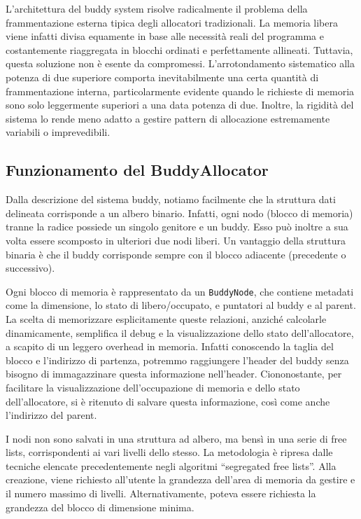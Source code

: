 L’architettura del buddy system risolve radicalmente il problema della frammentazione esterna tipica degli allocatori tradizionali. La memoria libera viene infatti divisa equamente in base alle necessità reali del programma e costantemente riaggregata in blocchi ordinati e perfettamente allineati. Tuttavia, questa soluzione non è esente da compromessi. L'arrotondamento sistematico alla potenza di due superiore comporta inevitabilmente una certa quantità di frammentazione interna, particolarmente evidente quando le richieste di memoria sono solo leggermente superiori a una data potenza di due. Inoltre, la rigidità del sistema lo rende meno adatto a gestire pattern di allocazione estremamente variabili o imprevedibili.

\subsection{Funzionamento del BuddyAllocator}

Dalla descrizione del sistema buddy, notiamo facilmente che la struttura dati delineata corrisponde a un albero binario. Infatti, ogni nodo (blocco di memoria) tranne la radice possiede un singolo genitore e un buddy. Esso può inoltre a sua volta essere scomposto in ulteriori due nodi liberi. Un vantaggio della struttura binaria è che il buddy corrisponde sempre con il blocco adiacente (precedente o successivo).

Ogni blocco di memoria è rappresentato da un \texttt{BuddyNode}, che contiene metadati come la dimensione, lo stato di libero/occupato, e puntatori al buddy e al parent. La scelta di memorizzare esplicitamente queste relazioni, anziché calcolarle dinamicamente, semplifica il debug e la visualizzazione dello stato dell'allocatore, a scapito di un leggero overhead in memoria. Infatti conoscendo la taglia del blocco e l’indirizzo di partenza, potremmo raggiungere l’header del buddy senza bisogno di immagazzinare questa informazione nell’header. Ciononostante, per facilitare la visualizzazione dell’occupazione di memoria e dello stato dell’allocatore, si è ritenuto di salvare questa informazione, così come anche l’indirizzo del parent.

I nodi non sono salvati in una struttura ad albero, ma bensì in una serie di free lists, corrispondenti ai vari livelli dello stesso. La metodologia è ripresa dalle tecniche elencate precedentemente negli algoritmi ``segregated free lists''. Alla creazione, viene richiesto all’utente la grandezza dell’area di memoria da gestire e il numero massimo di livelli. Alternativamente, poteva essere richiesta la grandezza del blocco di dimensione minima.

